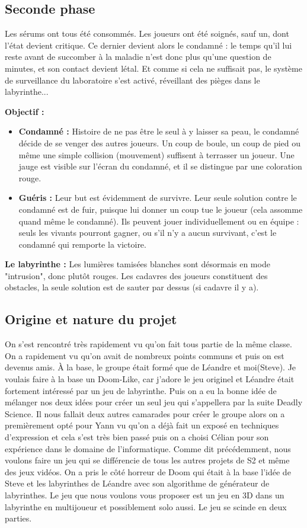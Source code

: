 \documentclass{article}
\begin{document}
\subsection{Seconde phase}

Les sérums ont tous été consommés. Les joueurs ont été soignés, sauf un, dont l'état devient critique. Ce dernier devient alors le condamné : le temps qu'il lui reste avant de succomber à la maladie n'est donc plus qu'une question de minutes, et son contact devient létal. Et comme si cela ne suffisait pas, le système de surveillance du laboratoire s'est activé, réveillant des pièges dans le labyrinthe...

\textbf{Objectif :}
\begin{itemize}
	\item \textbf{Condamné :} Histoire de ne pas être le seul à y laisser sa peau, le condamné décide de se venger des autres joueurs. Un coup de boule, un coup de pied ou même une simple collision (mouvement) suffisent à terrasser un joueur. Une jauge est visible sur l'écran du condamné, et il se distingue par une coloration rouge.
	\item \textbf{Guéris :} Leur but est évidemment de survivre. Leur seule solution contre le condamné est de fuir, puisque lui donner un coup tue le joueur (cela assomme quand même le condamné). Ils peuvent jouer individuellement ou en équipe : seuls les vivants pourront gagner, ou s'il n'y a aucun survivant, c'est le condamné qui remporte la victoire.
\end{itemize}

\textbf{Le labyrinthe :}
Les lumières tamisées blanches sont désormais en mode "intrusion", donc plutôt rouges.
Les cadavres des joueurs constituent des obstacles, la seule solution est de sauter par dessus (si cadavre il y a).


\subsection{Origine et nature du projet} 

On s’est rencontré très rapidement vu qu’on fait tous partie de la même classe. On a rapidement vu qu’on avait de nombreux points communs et puis on est devenus amis. À la base, le groupe était formé que de Léandre et moi(Steve). Je voulais faire à la base un Doom-Like, car j’adore le jeu originel et Léandre était fortement intéressé par un jeu de labyrinthe. Puis on a eu la bonne idée de mélanger nos deux idées pour créer un seul jeu qui s’appellera par la suite Deadly Science. Il nous fallait deux autres camarades pour créer le groupe alors on a premièrement opté pour Yann vu qu’on a déjà fait un exposé en techniques d’expression et cela s’est très bien passé puis on a choisi Célian pour son expérience dans le domaine de l’informatique.
Comme dit précédemment, nous voulons faire un jeu qui se différencie de tous les autres projets de S2 et même des jeux vidéos. On a pris le côté horreur de Doom qui était à la base l’idée de Steve et les labyrinthes de Léandre avec son algorithme de générateur de labyrinthes. Le jeu que nous voulons vous proposer est un jeu en 3D dans un labyrinthe en multijoueur et possiblement solo aussi. Le jeu se scinde en deux parties.
\end{document}
